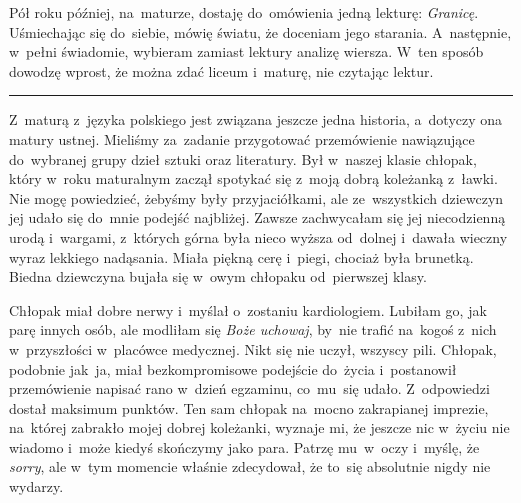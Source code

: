 \documentclass[9pt, a5paper]{memoir}
\begin{document}
Pół roku później, na~maturze, dostaję do~omówienia jedną lekturę: \textit{Granicę}. Uśmiechając się do~siebie, mówię światu, że doceniam jego starania. A~następnie, w~pełni świadomie, wybieram zamiast lektury analizę wiersza. W~ten sposób dowodzę wprost, że można zdać liceum i~maturę, nie czytając lektur.

\fancybreak{* \quad * \quad *}

Z~maturą z~języka polskiego jest związana jeszcze jedna historia, a~dotyczy ona matury ustnej. Mieliśmy za~zadanie przygotować przemówienie nawiązujące do~wybranej grupy dzieł sztuki oraz literatury. Był w~naszej klasie chłopak, który w~roku maturalnym zaczął spotykać się z~moją dobrą koleżanką z~ławki. Nie mogę powiedzieć, żebyśmy były przyjaciółkami, ale ze~wszystkich dziewczyn jej udało się do~mnie podejść najbliżej. Zawsze zachwycałam się jej niecodzienną urodą i~wargami, z~których górna była nieco wyższa od~dolnej i~dawała wieczny wyraz lekkiego nadąsania. Miała piękną cerę i~piegi, chociaż była brunetką. Biedna dziewczyna bujała się w~owym chłopaku od~pierwszej klasy.

Chłopak miał dobre nerwy i~myślał o~zostaniu kardiologiem. Lubiłam go, jak parę innych osób, ale modliłam się \textit{Boże uchowaj}, by~nie trafić na~kogoś z~nich w~przyszłości w~placówce medycznej. Nikt się nie uczył, wszyscy pili. Chłopak, podobnie jak~ja, miał bezkompromisowe podejście do~życia i~postanowił przemówienie napisać rano w~dzień egzaminu, co~mu~się udało. Z~odpowiedzi dostał maksimum punktów. Ten sam chłopak na~mocno zakrapianej imprezie, na~której zabrakło mojej dobrej koleżanki, wyznaje mi, że jeszcze nic w~życiu nie wiadomo i~może kiedyś skończymy jako para. Patrzę mu~w~oczy i~myślę, że \textit{sorry}, ale w~tym momencie właśnie zdecydował, że to~się absolutnie nigdy nie wydarzy.

\newpage
\end{document}
